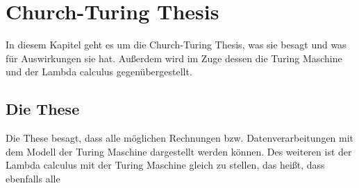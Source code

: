\section{Church-Turing Thesis}
In diesem Kapitel geht es um die Church-Turing Thesis, was sie besagt und was für Auswirkungen sie hat. Außerdem wird im Zuge dessen die Turing Maschine und der Lambda calculus gegenübergestellt.
\subsection{Die These}
Die These besagt, dass alle möglichen Rechnungen bzw. Datenverarbeitungen mit dem Modell der Turing Maschine dargestellt werden können. Des weiteren ist der Lambda calculus mit der Turing Maschine gleich zu stellen, das heißt, dass ebenfalls alle 
\cite{sep-church-turing}